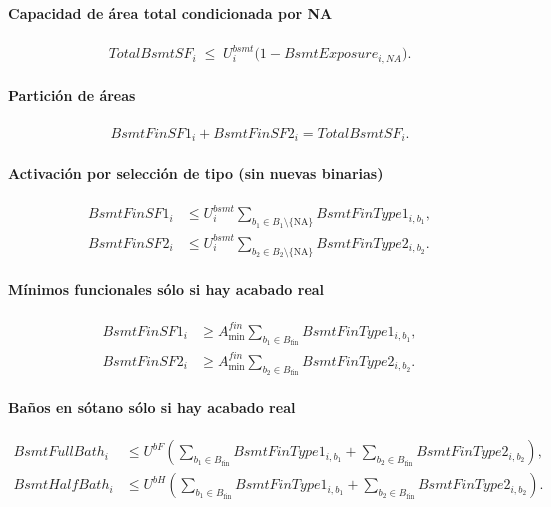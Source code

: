 \paragraph{Capacidad de área total condicionada por NA}
\begin{align}
TotalBsmtSF_i \;\le\; U^{bsmt}_i \big(1 - BsmtExposure_{i,NA}\big).
\end{align}

\paragraph{Partición de áreas}
\begin{align}
BsmtFinSF1_i + BsmtFinSF2_i = TotalBsmtSF_i.
\end{align}

\paragraph{Activación por selección de tipo (sin nuevas binarias)}
\begin{align}
BsmtFinSF1_i &\le U^{bsmt}_i \!\!\!\sum_{b_1\in B_1\setminus\{\text{NA}\}}\!\! BsmtFinType1_{i,b_1},\\
BsmtFinSF2_i &\le U^{bsmt}_i \!\!\!\sum_{b_2\in B_2\setminus\{\text{NA}\}}\!\! BsmtFinType2_{i,b_2}.
\end{align}

\paragraph{Mínimos funcionales sólo si hay acabado real}
\begin{align}
BsmtFinSF1_i &\ge A^{fin}_{\min} \sum_{b_1\in B_{\mathrm{fin}}} BsmtFinType1_{i,b_1},\\
BsmtFinSF2_i &\ge A^{fin}_{\min} \sum_{b_2\in B_{\mathrm{fin}}} BsmtFinType2_{i,b_2}.
\end{align}

\paragraph{Baños en sótano sólo si hay acabado real}
\begin{align}
BsmtFullBath_i &\le U^{bF}\!\left(
     \sum_{b_1\in B_{\mathrm{fin}}} BsmtFinType1_{i,b_1}
   + \sum_{b_2\in B_{\mathrm{fin}}} BsmtFinType2_{i,b_2} \right),\\
BsmtHalfBath_i &\le U^{bH}\!\left(
     \sum_{b_1\in B_{\mathrm{fin}}} BsmtFinType1_{i,b_1}
   + \sum_{b_2\in B_{\mathrm{fin}}} BsmtFinType2_{i,b_2} \right).
\end{align}

